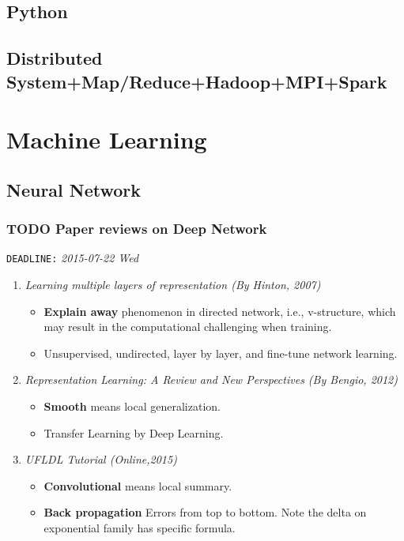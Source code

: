 \documentclass[11pt]{article}
\begin{document}
\subsection{Python}
\label{sec-1-3}
\subsection{Distributed System+Map/Reduce+Hadoop+MPI+Spark}
\label{sec-1-4}
\section{Machine Learning}
\label{sec-2}
\subsection{Neural Network}
\label{sec-2-1}
\subsubsection{\textbf{TODO} Paper reviews on Deep Network}
\label{sec-2-1-1}

    \texttt{DEADLINE:} \textit{2015-07-22 Wed}

\begin{enumerate}
\item \emph{Learning multiple layers of representation (By Hinton, 2007)}
\begin{itemize}
\item \textbf{Explain away} phenomenon in directed network, i.e., v-structure, which may result in the computational challenging when training.
\item Unsupervised, undirected, layer by layer, and fine-tune network learning.
\end{itemize}
\item \emph{Representation Learning: A Review and New Perspectives (By Bengio, 2012)}
\begin{itemize}
\item \textbf{Smooth} means local generalization.
\item Transfer Learning by Deep Learning.
\end{itemize}
\item \emph{UFLDL Tutorial (Online,2015)}
\begin{itemize}
\item \textbf{Convolutional} means local summary.
\item \textbf{Back propagation} Errors from top to bottom. Note the delta on exponential family has specific formula.
\end{itemize}
\end{enumerate}
\end{document}
